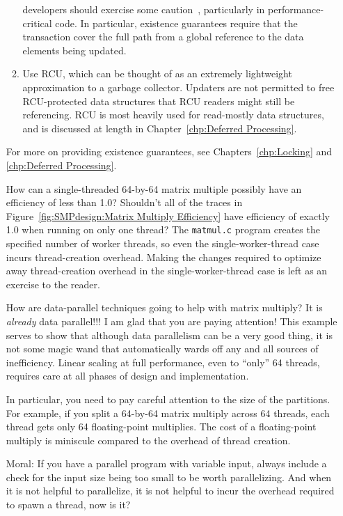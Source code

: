 \begin{enumerate}
\begin{enumerate}
		developers should exercise some
		caution~\cite{Blundell2005DebunkTM,Blundell2006TMdeadlock,McKenney2007PLOSTM},
		particularly in performance-critical code.
		In particular, existence guarantees require that the
		transaction cover the full path from a global reference
		to the data elements being updated.
	\item	Use RCU, which can be thought of as an extremely lightweight
		approximation to a garbage collector.
		Updaters are not permitted to free RCU-protected
		data structures that RCU readers might still be referencing.
		RCU is most heavily used for read-mostly data structures,
		and is discussed at length in
		Chapter~\ref{chp:Deferred Processing}.
	\end{enumerate}

	For more on providing existence guarantees, see
	Chapters~\ref{chp:Locking} and \ref{chp:Deferred Processing}.

\QuickQ{}
	How can a single-threaded 64-by-64 matrix multiple possibly
	have an efficiency of less than 1.0?
	Shouldn't all of the traces in
	Figure~\ref{fig:SMPdesign:Matrix Multiply Efficiency}
	have efficiency of exactly 1.0 when running on only one thread?
\QuickA{}
	The \texttt{matmul.c} program creates the specified number of
	worker threads, so even the single-worker-thread case incurs
	thread-creation overhead.
	Making the changes required to optimize away thread-creation
	overhead in the single-worker-thread case is left as an
	exercise to the reader.

\QuickQ{}
	How are data-parallel techniques going to help with matrix
	multiply?
	It is \emph{already} data parallel!!!
\QuickA{}
	I am glad that you are paying attention!
	This example serves to show that although data parallelism can
	be a very good thing, it is not some magic wand that automatically
	wards off any and all sources of inefficiency.
	Linear scaling at full performance, even to ``only'' 64 threads,
	requires care at all phases of design and implementation.

	In particular, you need to pay careful attention to the
	size of the partitions.
	For example, if you split a 64-by-64 matrix multiply across
	64 threads, each thread gets only 64 floating-point multiplies.
	The cost of a floating-point multiply is miniscule compared to
	the overhead of thread creation.

	Moral: If you have a parallel program with variable input,
	always include a check for the input size being too small to
	be worth parallelizing.
	And when it is not helpful to parallelize, it is not helpful
	to incur the overhead required to spawn a thread, now is it?


\end{enumerate}
